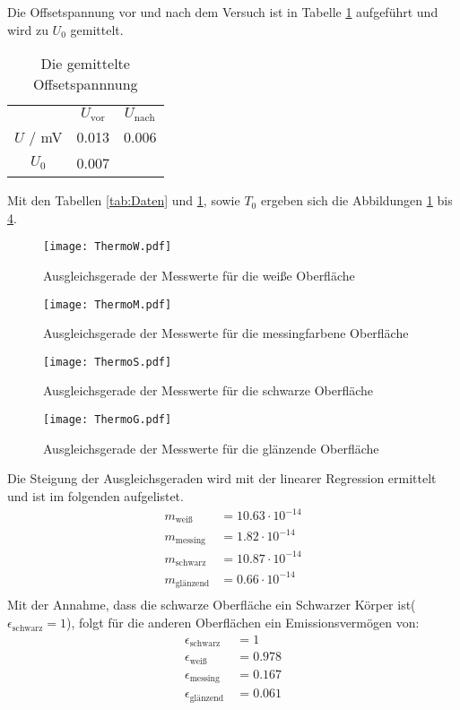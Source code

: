 Die Offsetspannung vor und nach dem Versuch ist in Tabelle \ref{tab:Offset} aufgeführt und wird zu $U_\text{0}$ gemittelt.

\begin{table}
  \centering
  \begin{tabular}{c c c}
    \toprule
      & $U_\text{vor}$ & $U_\text{nach}$  \\
      $U$ / mV      & 0.013 & 0.006       \\
      $U_\text{0}$  & 0.007 &             \\
    \bottomrule
  \end{tabular}
  \caption{Die gemittelte Offsetspannnung}
  \label{tab:Offset}
\end{table}

Mit den Tabellen \ref{tab:Daten} und \ref{tab:Offset}, sowie $T_0$ ergeben sich die Abbildungen \ref{fig:ThermoW} bis \ref{fig:ThermoG}.
\begin{figure}[H]
  \centering
  \texttt{[image: ThermoW.pdf]}
  \caption{Ausgleichsgerade der Messwerte für die weiße Oberfläche}
  \label{fig:ThermoW}
\end{figure}

\begin{figure}[H]
  \centering
  \texttt{[image: ThermoM.pdf]}
  \caption{Ausgleichsgerade der Messwerte für die messingfarbene Oberfläche}
  \label{fig:ThermoM}
\end{figure}

\begin{figure}[H]
  \centering
  \texttt{[image: ThermoS.pdf]}
  \caption{Ausgleichsgerade der Messwerte für die schwarze Oberfläche}
  \label{fig:ThermoS}
\end{figure}

\begin{figure}[H]
  \centering
  \texttt{[image: ThermoG.pdf]}
  \caption{Ausgleichsgerade der Messwerte für die glänzende Oberfläche}
  \label{fig:ThermoG}
\end{figure}
Die Steigung der Ausgleichsgeraden wird mit der linearer Regression ermittelt und ist im folgenden aufgelistet.
\begin{align*}
  m_\text{weiß}     &= 10.63 \cdot 10^{-14}  \\
  m_\text{messing}  &= 1.82  \cdot 10^{-14}  \\
  m_\text{schwarz}  &= 10.87 \cdot 10^{-14}  \\
  m_\text{glänzend} &= 0.66  \cdot 10^{-14}  \\
\end{align*}
Mit der Annahme, dass die schwarze Oberfläche ein Schwarzer Körper ist($\epsilon_\text{schwarz} = 1$), folgt für die anderen Oberflächen ein Emissionsvermögen von:
\begin{align*}
  \epsilon_\text{schwarz}  \, &= 1     \\
  \epsilon_\text{weiß}     \, &= 0.978 \\
  \epsilon_\text{messing}  \, &= 0.167 \\
  \epsilon_\text{glänzend} \, &= 0.061 \\
\end{align*}

